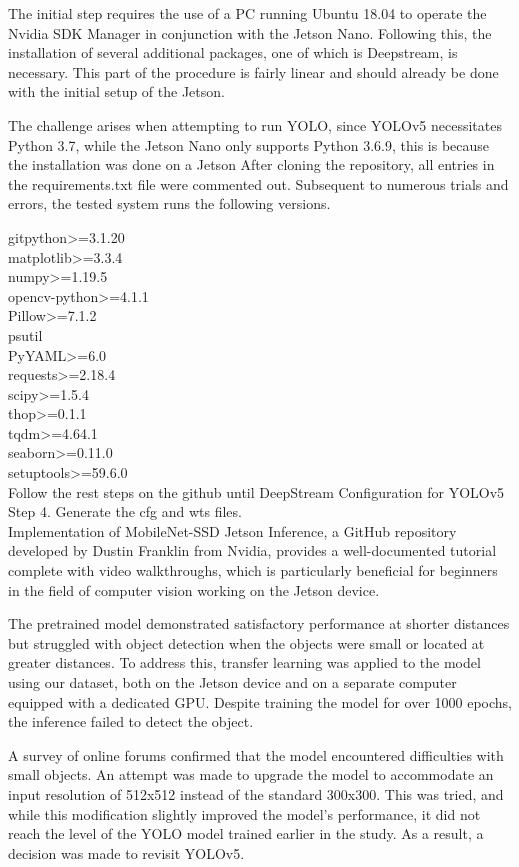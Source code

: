 The initial step requires the use of a PC running Ubuntu 18.04 to operate the Nvidia SDK Manager in conjunction with the Jetson Nano. Following this, the installation of several additional packages, one of which is Deepstream, is necessary. This part of the procedure is fairly linear and should already be done with the initial setup of the Jetson.

The challenge arises when attempting to run YOLO, since YOLOv5 necessitates Python 3.7, while the Jetson Nano only supports Python 3.6.9, this is because the installation was done on a Jetson  After cloning the repository, all entries in the requirements.txt file were commented out. Subsequent to numerous trials and errors, the tested system runs the following versions.

gitpython>=3.1.20\\
matplotlib>=3.3.4\\
numpy>=1.19.5\\
opencv-python>=4.1.1\\
Pillow>=7.1.2\\
psutil\\
PyYAML>=6.0\\
requests>=2.18.4\\
scipy>=1.5.4\\
thop>=0.1.1\\
tqdm>=4.64.1\\
seaborn>=0.11.0\\
setuptools>=59.6.0\\


Follow the rest steps on the github until DeepStream Configuration for YOLOv5 Step 4. Generate the cfg and wts files.\\

Implementation of MobileNet-SSD
Jetson Inference, a GitHub repository developed by Dustin Franklin from Nvidia, provides a well-documented tutorial complete with video walkthroughs, which is particularly beneficial for beginners in the field of computer vision working on the Jetson device.

The pretrained model demonstrated satisfactory performance at shorter distances but struggled with object detection when the objects were small or located at greater distances. To address this, transfer learning was applied to the model using our dataset, both on the Jetson device and on a separate computer equipped with a dedicated GPU. Despite training the model for over 1000 epochs, the inference failed to detect the object.

A survey of online forums confirmed that the model encountered difficulties with small objects. An attempt was made to upgrade the model to accommodate an input resolution of 512x512 instead of the standard 300x300. This was tried, and while this modification slightly improved the model's performance, it did not reach the level of the YOLO model trained earlier in the study. As a result, a decision was made to revisit YOLOv5.
